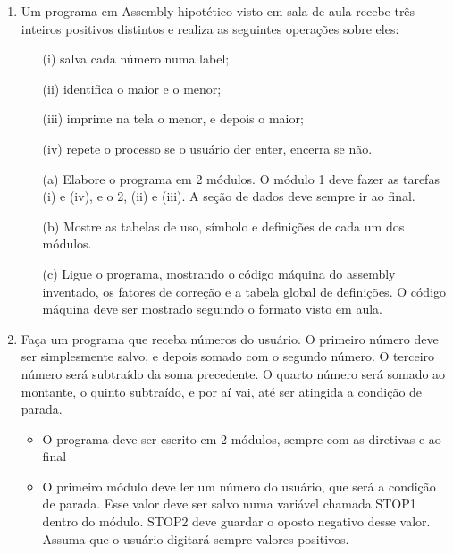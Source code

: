 \begin{enumerate}[resume]
    \item
    Um programa em Assembly hipotético visto em sala de aula 
    recebe três inteiros positivos distintos 
    e realiza as seguintes operações sobre eles:
    \begin{itemize}
        \item [(i)] salva cada número numa label;
        \item [(ii)] identifica o maior e o menor;
        \item [(iii)] imprime na tela o menor, e depois o maior;
        \item [(iv)] repete o processo se o usuário der enter, encerra se não.
    \end{itemize}

    \begin{itemize}
        \item [(a)]
        Elabore o programa em 2 módulos.
        O módulo 1 deve fazer as tarefas (i) e (iv), 
        e o 2, (ii) e (iii).
        A seção de dados deve sempre ir ao final.

        \item [(b)]
        Mostre as tabelas de uso, símbolo
        e definições de cada um dos módulos.

        \item [(c)]
        Ligue o programa, mostrando 
        o código máquina do assembly inventado,
        os fatores de correção 
        e a tabela global de definições.
        O código máquina deve ser mostrado 
        seguindo o formato visto em aula.
    \end{itemize}

    \item
    Faça um programa que receba números do usuário.
    O primeiro número deve ser simplesmente salvo,
    e depois somado com o segundo número.
    O terceiro número será subtraído da soma precedente.
    O quarto número será somado ao montante,
    o quinto subtraído, e por aí vai, até ser atingida a condição de parada.
    \begin{itemize}
        \item
        O programa deve ser escrito em 2 módulos, 
        sempre com as diretivas  e  ao final

        \item
        O primeiro módulo deve ler um número do usuário, que será a condição de parada.
        Esse valor deve ser salvo numa variável chamada STOP1 dentro do módulo.
        STOP2 deve guardar o oposto negativo desse valor.
        Assuma que o usuário digitará sempre valores positivos.


\end{itemize}
\end{enumerate}
